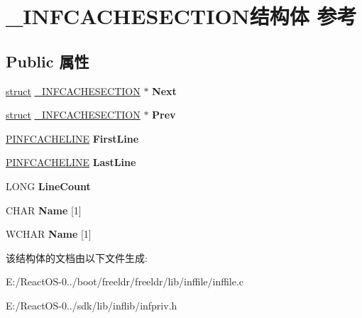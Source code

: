 \hypertarget{struct___i_n_f_c_a_c_h_e_s_e_c_t_i_o_n}{}\section{\+\_\+\+I\+N\+F\+C\+A\+C\+H\+E\+S\+E\+C\+T\+I\+O\+N结构体 参考}
\label{struct___i_n_f_c_a_c_h_e_s_e_c_t_i_o_n}
\subsection*{Public 属性}
\begin{DoxyCompactItemize}
\item 
\mbox{\label{struct___i_n_f_c_a_c_h_e_s_e_c_t_i_o_n_a23461fba150f8c4e34f0216c64981aac}} 
\hyperlink{interfacestruct}{struct} \hyperlink{struct___i_n_f_c_a_c_h_e_s_e_c_t_i_o_n}{\+\_\+\+I\+N\+F\+C\+A\+C\+H\+E\+S\+E\+C\+T\+I\+ON} $\ast$ {\bfseries Next}
\item 
\mbox{\label{struct___i_n_f_c_a_c_h_e_s_e_c_t_i_o_n_a0768fdfe3e1ebb4cd40011b78c25e905}} 
\hyperlink{interfacestruct}{struct} \hyperlink{struct___i_n_f_c_a_c_h_e_s_e_c_t_i_o_n}{\+\_\+\+I\+N\+F\+C\+A\+C\+H\+E\+S\+E\+C\+T\+I\+ON} $\ast$ {\bfseries Prev}
\item 
\mbox{\label{struct___i_n_f_c_a_c_h_e_s_e_c_t_i_o_n_a5b149cf3fac80fa556dc24bff368db2e}} 
\hyperlink{struct___i_n_f_c_a_c_h_e_l_i_n_e}{P\+I\+N\+F\+C\+A\+C\+H\+E\+L\+I\+NE} {\bfseries First\+Line}
\item 
\mbox{\label{struct___i_n_f_c_a_c_h_e_s_e_c_t_i_o_n_a008c372b0b94e9ece3f38e97826c8236}} 
\hyperlink{struct___i_n_f_c_a_c_h_e_l_i_n_e}{P\+I\+N\+F\+C\+A\+C\+H\+E\+L\+I\+NE} {\bfseries Last\+Line}
\item 
\mbox{\label{struct___i_n_f_c_a_c_h_e_s_e_c_t_i_o_n_ab0a3dfd810ef320123aa180449d8948e}} 
L\+O\+NG {\bfseries Line\+Count}
\item 
\mbox{\label{struct___i_n_f_c_a_c_h_e_s_e_c_t_i_o_n_aa18d8fdac6ca0403ddf87afa9c061a2f}} 
C\+H\+AR {\bfseries Name} \mbox{[}1\mbox{]}
\item 
\mbox{\label{struct___i_n_f_c_a_c_h_e_s_e_c_t_i_o_n_a48ecab71145b61cb0386801188e0f6a9}} 
W\+C\+H\+AR {\bfseries Name} \mbox{[}1\mbox{]}
\end{DoxyCompactItemize}


该结构体的文档由以下文件生成\+:\begin{DoxyCompactItemize}
\item 
E\+:/\+React\+O\+S-\/0../boot/freeldr/freeldr/lib/inffile/inffile.\+c\item 
E\+:/\+React\+O\+S-\/0../sdk/lib/inflib/infpriv.\+h\end{DoxyCompactItemize}
